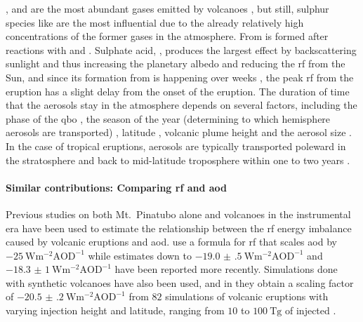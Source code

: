 \documentclass{ametsocV5}
\newcommand{\iso}[1][i]{{#1}njected \ce{SO2}}
\begin{document}
,  and  are the most abundant gases emitted by volcanoes
\citep{robock2000}, but still, sulphur species like  are the most influential
due to the already relatively high concentrations of the former gases in the atmosphere.
From   is formed after reactions with  and 
\citep{robock2000}. Sulphate acid, , produces the largest effect by
backscattering sunlight and thus increasing the planetary albedo and reducing the
\ac{rf} from the Sun, and since its formation from  is happening over weeks
\citep{robock2000}, the peak \ac{rf} from the eruption has a slight delay from the onset
of the eruption. The duration of time that the  aerosols stay in the
atmosphere depends on several factors, including the phase of the \ac{qbo}
\citep{pitari2016b}, the season of the year (determining to which hemisphere aerosols
are transported) \citep{toohey2011,toohey2019}, latitude \citep{marshall2019,
  toohey2019}, volcanic plume height \citep{marshall2019} and the aerosol size
\citep{marshall2019}. In the case of tropical eruptions, aerosols are typically
transported poleward in the stratosphere and back to mid-latitude troposphere within one
to two years \citep{robock2000}.


\paragraph*{Similar contributions: Comparing \acs*{rf} and \acs*{aod}}

Previous studies on both Mt.\ Pinatubo alone \citep{mills2017,hansen2005} and volcanoes
in the instrumental era \citep{gregory2016} have been used to estimate the relationship
between the \ac{rf} energy imbalance caused by volcanic eruptions and \ac{aod}.
\citet{myhre2013} use a formula for \ac{rf} that scales \ac{aod} by
\(\SI{-25}{\watt\metre^{-2}\mathrm{AOD}^{-1}}\) while estimates down to
\(\SI{-19.0(5)}{\watt\metre^{-2}\mathrm{AOD}^{-1}}\) \citep{gregory2016} and
\(\SI{-18.3(10)}{\watt\metre^{-2}\mathrm{AOD}^{-1}}\) \citep{mills2017} have been
reported more recently. Simulations done with synthetic volcanoes have also been used,
and in \citet{marshall2020} they obtain a scaling factor of
\(\SI{-20.5(2)}{\watt\metre^{-2}\mathrm{AOD}^{-1}}\) from \(82\) simulations of volcanic
eruptions with varying injection height and latitude, ranging from \(10\) to
\(\SI{100}{\tera\gram}\) of \iso{}.
\end{document}
